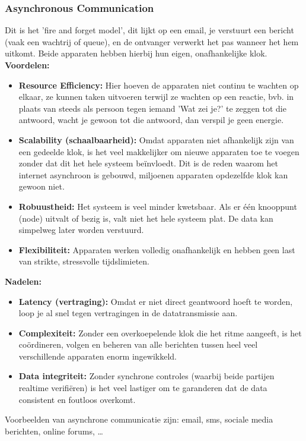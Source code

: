 \documentclass[a4paper,11pt,twoside]{report}
\begin{document}
\subsubsection{Asynchronous Communication}
Dit is het 'fire and forget model', dit lijkt op een email, je verstuurt een bericht (vaak een
wachtrij of queue), en de ontvanger verwerkt het pas wanneer het hem uitkomt. Beide apparaten hebben
hierbij hun eigen, onafhankelijke klok.
\newline
{\color{green}\textbf{Voordelen: }}
\begin{itemize}
    \item \textbf{Resource Efficiency:} Hier hoeven de apparaten niet continu te wachten op elkaar,
    ze kunnen taken uitvoeren terwijl ze wachten op een reactie, bvb. in plaats van steeds als
    persoon tegen iemand 'Wat zei je?' te zeggen tot die antwoord, wacht je gewoon tot die antwoord,
    dan verspil je geen energie.
    \item \textbf{Scalability (schaalbaarheid):} Omdat apparaten niet afhankelijk zijn van een
    gedeelde klok, is het veel makkelijker om nieuwe apparaten toe te voegen zonder dat dit het hele
    systeem beïnvloedt. Dit is de reden waarom het internet asynchroon is gebouwd, miljoenen
    apparaten opdezelfde klok kan gewoon niet.
    \item \textbf{Robuustheid:} Het systeem is veel minder kwetsbaar. Als er één knooppunt (node)
    uitvalt of bezig is, valt niet het hele systeem plat. De data kan simpelweg later worden
    verstuurd.
    \item \textbf{Flexibiliteit:} Apparaten werken volledig onafhankelijk en hebben geen last van
    strikte, stressvolle tijdslimieten.
\end{itemize}
{\color{red}\textbf{Nadelen: }}
\begin{itemize}
    \item \textbf{Latency (vertraging):} Omdat er niet direct geantwoord hoeft te worden, loop je al
    snel tegen vertragingen in de datatransmissie aan.
    \item \textbf{Complexiteit:} Zonder een overkoepelende klok die het ritme aangeeft, is het
    coördineren, volgen en beheren van alle berichten tussen heel veel verschillende apparaten enorm
    ingewikkeld.
    \item \textbf{Data integriteit:} Zonder synchrone controles (waarbij beide partijen realtime
    verifiëren) is het veel lastiger om te garanderen dat de data consistent en foutloos overkomt.
\end{itemize}
Voorbeelden van asynchrone communicatie zijn: email, sms, sociale media berichten, online forums,
\dots
\end{document}
